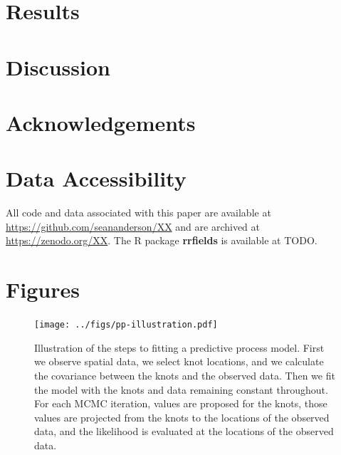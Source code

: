 \documentclass[12pt,english]{article}
\begin{document}
\begin{spacing}{1.25}

\section{Results}

\section{Discussion}

\section{Acknowledgements}

\section{Data Accessibility}

All code and data associated with this paper are available at
\url{https://github.com/seananderson/XX} and are archived at
\url{https://zenodo.org/XX}.
The R package \textbf{rrfields} is available at TODO.

\section{Figures}

\begin{figure}[htb]
\begin{center}
  \texttt{[image: ../figs/pp-illustration.pdf]}
\caption{
Illustration of the steps to fitting a predictive process model.
First we observe spatial data, we select knot locations,
and we calculate the covariance between the knots and the observed data.
Then we fit the model with the knots and data remaining constant throughout.
For each MCMC iteration, values are proposed for the
knots, those values are projected from the knots to the locations of the observed data,
and the likelihood is evaluated at the locations of the observed data.}
\label{fig:didactic}
\end{center}
\end{figure}


\end{spacing}
\end{document}
